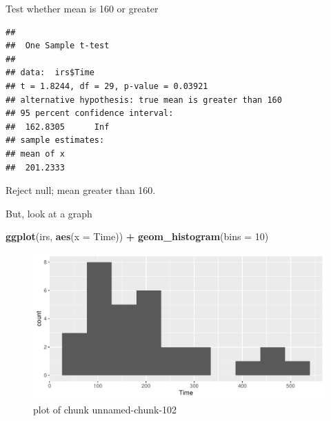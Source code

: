 \documentclass[
  ignorenonframetext,
]{beamer}
\newenvironment{Shaded}{\begin{snugshade}}{\end{snugshade}}
\newcommand{\DataTypeTok}[1]{\textcolor[rgb]{0.13,0.29,0.53}{#1}}
\newcommand{\DecValTok}[1]{\textcolor[rgb]{0.00,0.00,0.81}{#1}}
\newcommand{\KeywordTok}[1]{\textcolor[rgb]{0.13,0.29,0.53}{\textbf{#1}}}
\newcommand{\NormalTok}[1]{#1}
\newcommand{\OperatorTok}[1]{\textcolor[rgb]{0.81,0.36,0.00}{\textbf{#1}}}
\newcommand{\StringTok}[1]{\textcolor[rgb]{0.31,0.60,0.02}{#1}}
\begin{document}
\begin{frame}[fragile]{Test whether mean is 160 or greater}
\protect\hypertarget{test-whether-mean-is-160-or-greater}{}

\begin{Shaded}
\end{Shaded}

\begin{verbatim}
## 
##  One Sample t-test
## 
## data:  irs$Time
## t = 1.8244, df = 29, p-value = 0.03921
## alternative hypothesis: true mean is greater than 160
## 95 percent confidence interval:
##  162.8305      Inf
## sample estimates:
## mean of x 
##  201.2333
\end{verbatim}

Reject null; mean greater than 160.

\end{frame}

\begin{frame}[fragile]{But, look at a graph}
\protect\hypertarget{but-look-at-a-graph}{}

\begin{Shaded}
\begin{Highlighting}[]
\KeywordTok{ggplot}\NormalTok{(irs, }\KeywordTok{aes}\NormalTok{(}\DataTypeTok{x =}\NormalTok{ Time)) }\OperatorTok{+}\StringTok{ }\KeywordTok{geom_histogram}\NormalTok{(}\DataTypeTok{bins =} \DecValTok{10}\NormalTok{)}
\end{Highlighting}
\end{Shaded}

\begin{figure}
\centering
\includegraphics{figure/unnamed-chunk-102-1.pdf}
\caption{plot of chunk unnamed-chunk-102}
\end{figure}

\end{frame}
\end{document}
